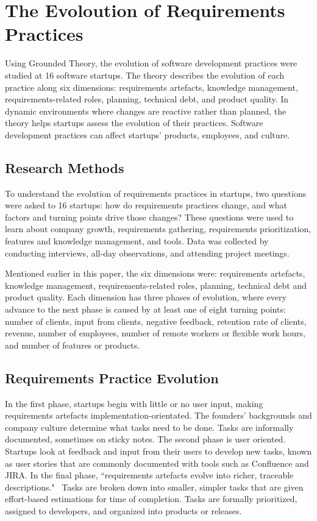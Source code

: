 \documentclass{sig-alternate}
\begin{document}
\section{The Evoloution of Requirements Practices}
\label{sec:practicesEvolution}
Using Grounded Theory, the evolution of software development practices were studied at 16 software startups. The theory describes the evolution of each practice along six dimensions: requirements artefacts, knowledge management, requirements-related roles, planning, technical debt, and product quality. In dynamic environments where changes are reactive rather than planned, the theory helps startups assess the evolution of their practices. Software development practices can affect startups' products, employees, and culture.

\subsection{Research Methods}
\label{sec:researchMethods}
To understand the evolution of requirements practices in startups, two questions were asked to 16 startups: how do requirements practices change, and what factors and turning points drive those changes? These questions were used to learn about company growth, requirements gathering, requirements prioritization, features and knowledge management, and tools. Data was collected by conducting interviews, all-day observations, and attending project meetings. 

Mentioned earlier in this paper, the six dimensions were: requirements artefacts, knowledge management, requirements-related roles, planning, technical debt and product quality. Each dimension has three phases of evolution, where every advance to the next phase is caused by at least one of eight turning points: number of clients, input from clients, negative feedback, retention rate of clients, revenue, number of employees, number of remote workers or flexible work hours, and number of features or products.

\subsection{Requirements Practice Evolution}
\label{sec:reqPracticeEvolution}
In the first phase, startups begin with little or no user input, making requirements artefacts implementation-orientated. The founders' backgrounds and company culture determine what tasks need to be done. Tasks are informally documented, sometimes on sticky notes. The second phase is user oriented. Startups look at feedback and input from their users to develop new tasks, known as user stories that are commonly documented with tools such as Confluence and JIRA. In the final phase, ``requirements artefacts evolve into richer, traceable descriptions."~\cite{Gralha:2018} Tasks are broken down into smaller, simpler tasks that are given effort-based estimations for time of completion. Tasks are formally prioritized, assigned to developers, and organized into products or releases.
\end{document}
